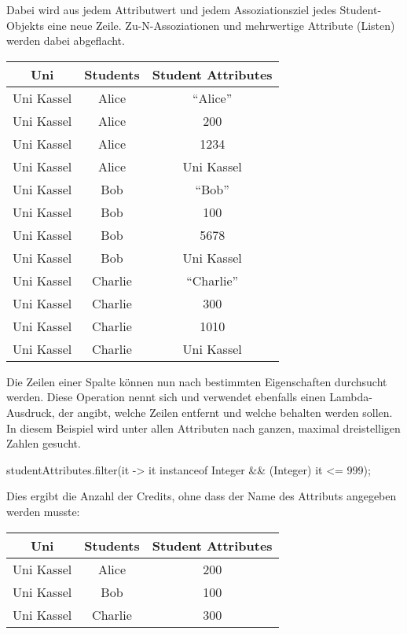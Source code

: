 Dabei wird aus jedem Attributwert und jedem Assoziationsziel jedes Student-Objekts eine neue Zeile.
Zu-N-Assoziationen und mehrwertige Attribute (Listen) werden dabei abgeflacht.

\begin{tabular}{|c|c|c|}
    \hline
    \textbf{Uni} & \textbf{Students} & \textbf{Student Attributes} \\
    \hline
    Uni Kassel & Alice   & ``Alice'' \\
    Uni Kassel & Alice   & 200  \\
    Uni Kassel & Alice   & 1234  \\
    Uni Kassel & Alice   & Uni Kassel  \\
    Uni Kassel & Bob     & ``Bob'' \\
    Uni Kassel & Bob     & 100  \\
    Uni Kassel & Bob     & 5678  \\
    Uni Kassel & Bob     & Uni Kassel  \\
    Uni Kassel & Charlie & ``Charlie'' \\
    Uni Kassel & Charlie & 300  \\
    Uni Kassel & Charlie & 1010  \\
    Uni Kassel & Charlie & Uni Kassel  \\
    \hline
\end{tabular}

Die Zeilen einer Spalte können nun nach bestimmten Eigenschaften durchsucht werden.
Diese Operation nennt sich  und verwendet ebenfalls einen Lambda-Ausdruck,
der angibt, welche Zeilen entfernt und welche behalten werden sollen.
In diesem Beispiel wird unter allen Attributen nach ganzen, maximal dreistelligen Zahlen gesucht.

\begin{jcodeblock}
    studentAttributes.filter(it -> it instanceof Integer && (Integer) it <= 999);
\end{jcodeblock}

Dies ergibt die Anzahl der Credits, ohne dass der Name des Attributs angegeben werden musste:

\begin{tabular}{|c|c|c|}
    \hline
    \textbf{Uni} & \textbf{Students} & \textbf{Student Attributes} \\
    \hline
    Uni Kassel & Alice   & 200 \\
    Uni Kassel & Bob     & 100 \\
    Uni Kassel & Charlie & 300 \\
    \hline
\end{tabular}

